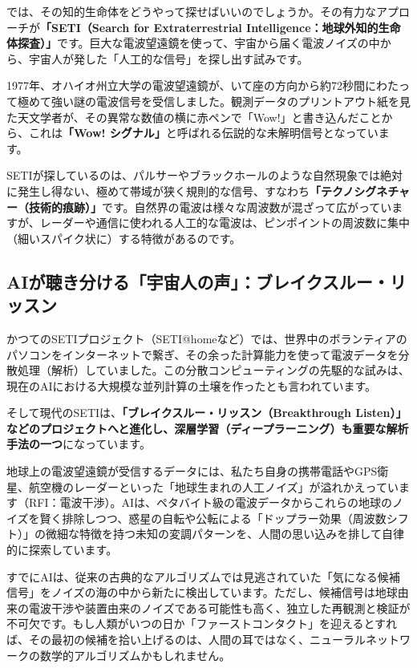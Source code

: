 では、その知的生命体をどうやって探せばいいのでしょうか。その有力なアプローチが\textbf{「SETI（Search for Extraterrestrial Intelligence：地球外知的生命体探査）」}です。巨大な電波望遠鏡を使って、宇宙から届く電波ノイズの中から、宇宙人が発した「人工的な信号」を探し出す試みです。

1977年、オハイオ州立大学の電波望遠鏡が、いて座の方向から約72秒間にわたって極めて強い謎の電波信号を受信しました。観測データのプリントアウト紙を見た天文学者が、その異常な数値の横に赤ペンで「Wow!」と書き込んだことから、これは\textbf{「Wow! シグナル」}と呼ばれる伝説的な未解明信号となっています。

SETIが探しているのは、パルサーやブラックホールのような自然現象では絶対に発生し得ない、極めて帯域が狭く規則的な信号、すなわち\textbf{「テクノシグネチャー（技術的痕跡）」}です。自然界の電波は様々な周波数が混ざって広がっていますが、レーダーや通信に使われる人工的な電波は、ピンポイントの周波数に集中（細いスパイク状に）する特徴があるのです。

\subsection{AIが聴き分ける「宇宙人の声」：ブレイクスルー・リッスン}

かつてのSETIプロジェクト（SETI@homeなど）では、世界中のボランティアのパソコンをインターネットで繋ぎ、その余った計算能力を使って電波データを分散処理（解析）していました。この分散コンピューティングの先駆的な試みは、現在のAIにおける大規模な並列計算の土壌を作ったとも言われています。

そして現代のSETIは、\textbf{「ブレイクスルー・リッスン（Breakthrough Listen）」などのプロジェクトへと進化し、深層学習（ディープラーニング）も重要な解析手法の一つ}になっています。

地球上の電波望遠鏡が受信するデータには、私たち自身の携帯電話やGPS衛星、航空機のレーダーといった「地球生まれの人工ノイズ」が溢れかえっています（RFI：電波干渉）。AIは、ペタバイト級の電波データからこれらの地球のノイズを賢く排除しつつ、惑星の自転や公転による「ドップラー効果（周波数シフト）」の微細な特徴を持つ未知の変調パターンを、人間の思い込みを排して自律的に探索しています。

すでにAIは、従来の古典的なアルゴリズムでは見逃されていた「気になる候補信号」をノイズの海の中から新たに検出しています。ただし、候補信号は地球由来の電波干渉や装置由来のノイズである可能性も高く、独立した再観測と検証が不可欠です。もし人類がいつの日か「ファーストコンタクト」を迎えるとすれば、その最初の候補を拾い上げるのは、人間の耳ではなく、ニューラルネットワークの数学的アルゴリズムかもしれません。

